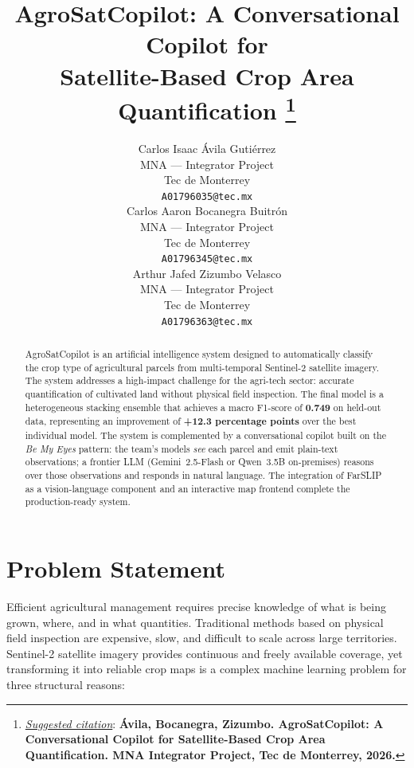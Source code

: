 \documentclass{article}
\title{AgroSatCopilot: A Conversational Copilot for\\
Satellite-Based Crop Area Quantification
\thanks{\textit{\underline{Suggested citation}}: \textbf{\'Avila, Bocanegra,
Zizumbo. AgroSatCopilot: A Conversational Copilot for Satellite-Based Crop
Area Quantification. MNA Integrator Project, Tec de Monterrey, 2026.}}
}
\author{
  Carlos Isaac \'Avila Guti\'errez \\
  MNA --- Integrator Project \\
  Tec de Monterrey \\
  \texttt{A01796035@tec.mx} \\
  \And
  Carlos Aaron Bocanegra Buitr\'on \\
  MNA --- Integrator Project \\
  Tec de Monterrey \\
  \texttt{A01796345@tec.mx} \\
  \And
  Arthur Jafed Zizumbo Velasco \\
  MNA --- Integrator Project \\
  Tec de Monterrey \\
  \texttt{A01796363@tec.mx} \\
}
\begin{document}
\maketitle

\begin{abstract}
AgroSatCopilot is an artificial intelligence system designed to automatically
classify the crop type of agricultural parcels from multi-temporal Sentinel-2
satellite imagery. The system addresses a high-impact challenge for the
agri-tech sector: accurate quantification of cultivated land without
physical field inspection. The final model is a heterogeneous stacking
ensemble that achieves a macro F1-score of \textbf{0.749} on held-out data,
representing an improvement of \textbf{+12.3 percentage points} over the
best individual model. The system is complemented by a conversational
copilot built on the \textit{Be My Eyes} pattern: the team's models
\textit{see} each parcel and emit plain-text observations; a frontier LLM
(Gemini~2.5-Flash or Qwen~3.5B on-premises) reasons over those observations
and responds in natural language. The integration of
FarSLIP~\cite{li2025farslip} as a vision-language component and an
interactive map frontend complete the production-ready system.
\end{abstract}


\section{Problem Statement}

Efficient agricultural management requires precise knowledge of what is
being grown, where, and in what quantities. Traditional methods based on
physical field inspection are expensive, slow, and difficult to scale
across large territories. Sentinel-2 satellite imagery provides continuous
and freely available coverage, yet transforming it into reliable crop maps
is a complex machine learning problem for three structural reasons:
\end{document}
